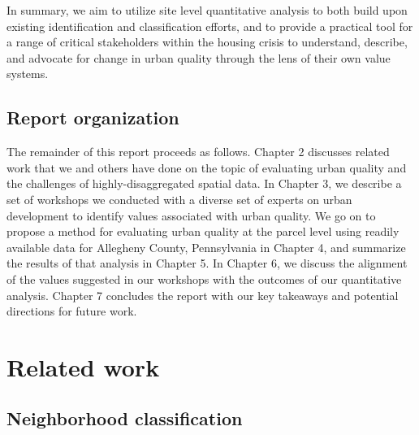 \documentclass[
]{book}
\begin{document}
In summary, we aim to utilize site level quantitative analysis to both build upon existing identification and classification efforts, and to provide a practical tool for a range of critical stakeholders within the housing crisis to understand, describe, and advocate for change in urban quality through the lens of their own value systems.

\hypertarget{report-organization}{%
\section{Report organization}\label{report-organization}}

The remainder of this report proceeds as follows. Chapter 2 discusses related
work that we and others have done on the topic of evaluating urban quality
and the challenges of highly-disaggregated spatial data. In Chapter 3, we
describe a set of workshops we conducted with a diverse set of experts on
urban development to identify values associated with urban quality. We go on
to propose a method for evaluating urban quality at the parcel level using
readily available data for Allegheny County, Pennsylvania in Chapter 4, and
summarize the results of that analysis in Chapter 5. In Chapter 6, we discuss
the alignment of the values suggested in our workshops with the outcomes
of our quantitative analysis. Chapter 7 concludes the report with our key
takeaways and potential directions for future work.

\hypertarget{related-work}{%
\chapter{Related work}\label{related-work}}

\hypertarget{neighborhood-classification}{%
\section{Neighborhood classification}\label{neighborhood-classification}}
\end{document}
